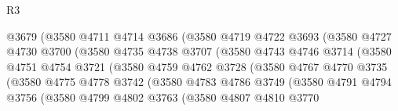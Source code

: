 \begin{lexlean}{R3}
\begin{coremodule}
                              @3679
                              (@3580
                                @4711
                                @4714
                                @3686
                                (@3580
                                  @4719
                                  @4722
                                  @3693
                                  (@3580
                                    @4727
                                    @4730
                                    @3700
                                    (@3580
                                      @4735
                                      @4738
                                      @3707
                                      (@3580
                                        @4743
                                        @4746
                                        @3714
                                        (@3580
                                          @4751
                                          @4754
                                          @3721
                                          (@3580
                                            @4759
                                            @4762
                                            @3728
                                            (@3580
                                              @4767
                                              @4770
                                              @3735
                                              (@3580
                                                @4775
                                                @4778
                                                @3742
                                                (@3580
                                                  @4783
                                                  @4786
                                                  @3749
                                                  (@3580
                                                    @4791
                                                    @4794
                                                    @3756
                                                    (@3580
                                                      @4799
                                                      @4802
                                                      @3763
                                                      (@3580
                                                        @4807
                                                        @4810
                                                        @3770

\end{coremodule}
\end{lexlean}
